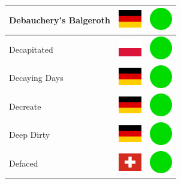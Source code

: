 \documentclass[12pt, a4paper, twoside]{report}
\begin{document}
\begin{center}
\begin{longtable}{|p{5cm}|p{2cm}|p{2cm}|}
 Debauchery's Balgeroth                                     & \includegraphics[width=1cm]{../4x3/de} &   \includegraphics[width=1cm]{../likes/y} \\ \hline
 Decapitated                                                & \includegraphics[width=1cm]{../4x3/pl} &   \includegraphics[width=1cm]{../likes/y} \\ \hline
 Decaying Days                                              & \includegraphics[width=1cm]{../4x3/de} &   \includegraphics[width=1cm]{../likes/y} \\ \hline
 Decreate                                                   & \includegraphics[width=1cm]{../4x3/de} &   \includegraphics[width=1cm]{../likes/y} \\ \hline
 Deep Dirty                                                 & \includegraphics[width=1cm]{../4x3/de} &   \includegraphics[width=1cm]{../likes/y} \\ \hline
 Defaced                                                    & \includegraphics[width=1cm]{../4x3/ch} &   \includegraphics[width=1cm]{../likes/y} \\ \hline

\end{longtable}
\end{center}
\end{document}
